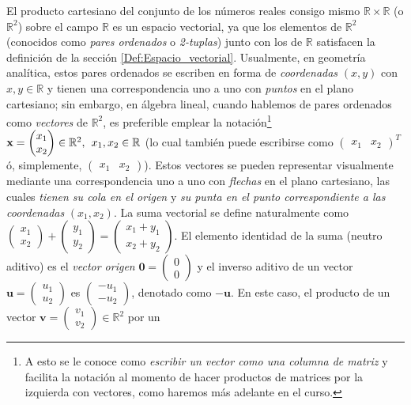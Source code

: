 \documentclass[12pt,dvipsnames]{article}
\begin{document}
El producto cartesiano del conjunto de los números reales consigo mismo $\mathbb{R}\times\mathbb{R}$ (o $\mathbb{R}^2$) sobre el campo $\mathbb{R}$ es un espacio vectorial, ya que los elementos de $\mathbb{R}^2$ (conocidos como \textit{pares ordenados} o \textit{2-tuplas}) junto con los de $\mathbb{R}$ satisfacen la definición de la sección \ref{Def:Espacio_vectorial}. Usualmente, en geometría analítica, estos pares ordenados se escriben en forma de \emph{coordenadas} $(x,y)$ con $x,y \in \mathbb{R}$ y tienen una correspondencia uno a uno con \emph{puntos} en el plano cartesiano; sin embargo, en álgebra lineal, cuando hablemos de pares ordenados como \emph{vectores} de $\mathbb{R}^2$, es preferible emplear la notación\footnote{A esto se le conoce como \emph{escribir un vector como una columna de matriz} y facilita la notación al momento de hacer productos de matrices por la izquierda con vectores, como haremos más adelante en el curso.} $\textbf{x}=\begin{pmatrix}x_1\\x_2\end{pmatrix}\in\mathbb{R}^2,\hspace{1.5mm}x_1,x_2\in\mathbb{R}$ (lo cual también puede escribirse como $\begin{pmatrix}x_1&x_2\end{pmatrix}^T$ ó, simplemente, $\begin{pmatrix}x_1&x_2\end{pmatrix}$). Estos vectores se pueden representar visualmente mediante una correspondencia uno a uno con \emph{flechas} en el plano cartesiano, las cuales \emph{tienen su cola en el origen} y \emph{su punta en el punto correspondiente a las coordenadas} $(x_1,x_2)$. La suma vectorial se define naturalmente como $\begin{pmatrix}x_1\\x_2\end{pmatrix}+\begin{pmatrix}y_1\\y_2\end{pmatrix}=\begin{pmatrix}x_1+y_1\\x_2+y_2\end{pmatrix}$. El elemento identidad de la suma (neutro aditivo) es el \emph{vector origen} $\mathbf{0}=\begin{pmatrix}0\\0\end{pmatrix}$ y el inverso aditivo de un vector $\mathbf{u}=\begin{pmatrix}u_1\\u_2\end{pmatrix}$ es $\begin{pmatrix}-u_1\\-u_2\end{pmatrix}$, denotado como $-\mathbf{u}$. En este caso, el producto de un vector $\textbf{v}=\begin{pmatrix}v_1\\v_2\end{pmatrix}\in\mathbb{R}^2$ por un 
\end{document}
